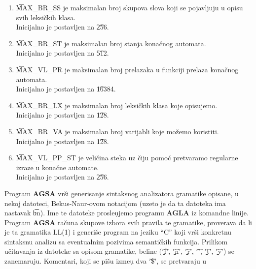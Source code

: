       \begin{enumerate}
        \item
        {
          \t{MAX\_BR\_SS} je maksimalan broj skupova slova koji se
          pojavljuju u opisu svih leksi\v ckih klasa.\\
          Inicijalno je postavljen na \t{256}.
        }
        \item
        {
          \t{MAX\_BR\_ST} je maksimalan broj stanja kona\v cnog
          automata.\\
          Inicijalno je postavljen na \t{512}.
        }
        \item
        {
          \t{MAX\_VL\_PR} je maksimalan broj prelazaka u funkciji
          prelaza kona\v cnog automata.\\
          Inicijalno je postavljen na \t{16384}.
        }
        \item
        {
          \t{MAX\_BR\_LX} je maksimalan broj leksi\v ckih klasa koje
          opisujemo.\\
          Inicijalno je postavljen na \t{128}.
        }
        \item
        {
          \t{MAX\_BR\_VA} je maksimalan broj varijabli koje mo\v zemo
          koristiti.\\
          Inicijalno je postavljen na \t{128}.
        }
        \item
        {
          \t{MAX\_VL\_PP\_ST} je veli\v cina steka uz \v ciju pomo\'c
          pretvaramo regularne izraze u kona\v cne automate.\\
          Inicijalno je postavljen na \t{256}.
        }
      \end{enumerate}
%
%
    Program {\bf AGSA} vr\v si generisanje sintaksnog analizatora gramatike
    opisane, u nekoj datoteci, Bekus-Naur-ovom notacijom (uzeto je da ta
    datoteka ima nastavak \t{bn}).
    Ime te datoteke prosle\d ujemo programu {\bf AGLA} iz komandne linije.
    Program {\bf AGSA} ra\v cuna skupove izbora svih pravila te gramatike,
    proverava da li je ta gramatika LL(1) i generi\v se program na jeziku
    ``C'' koji vr\v si konkretnu sintaksnu analizu sa eventualnim pozivima
    semanti\v ckih funkcija.
%
%
      Prilikom u\v citavanja iz datoteke sa opisom gramatike, beline
      (\t{'{\b}f'}, \t{'{\b}n'}, \t{'{\b}r'}, \t{'\s'}, \t{'{\b}t'},
      \t{'{\b}v'}) se zanemaruju.
      Komentari, koji se pi\v su izme\d u dva \t{'\$'}, se pre\-tvaraju u
